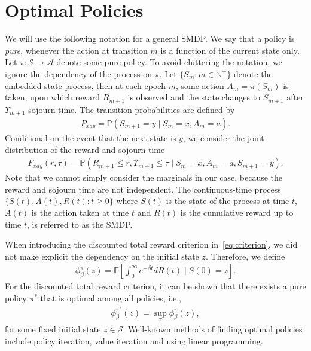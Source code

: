 \documentclass{article}
\theoremstyle{definition}
\theoremstyle{plain}
\begin{document}
\section{Optimal Policies}

We will use the following notation for a general SMDP. We say that a policy is
\textit{pure}, whenever the action at transition $m$ is a function of the
current state only. Let $\pi : \mathcal{S} \rightarrow \mathcal{A}$ denote some
pure policy. To avoid cluttering the notation, we ignore the dependency of the
process on $\pi$. Let $\{ S_{m} : m \in \mathbb{N}^{+} \}$ denote the embedded
state process, then at each epoch $m$, some action $A_{m} = \pi(S_{m})$ is
taken, upon which reward $R_{m+1}$ is observed and the state changes to
$S_{m+1}$ after $\Upsilon_{m+1}$ sojourn time. The transition probabilities are
defined by
\begin{align}
  P_{xay} = \mathbb{P}(S_{m+1} = y \; | \; S_{m} = x, A_{m} = a) .
\end{align}
Conditional on the event that the next state is $y$, we consider the joint
distribution of the reward and sojourn time
\begin{align}
  F_{xay}(r, \tau) = \mathbb{P}(R_{m+1} \leq r, \Upsilon_{m+1} \leq \tau \; | \; S_{m} = x, A_{m} = a, S_{m+1} = y ) .
\end{align}
Note that we cannot simply consider the marginals in our case, because the
reward and sojourn time are not independent. The continuous-time process
$\{ S(t), A(t), R(t) : t \geq 0 \}$ where $S(t)$ is the state of the process at
time $t$, $A(t)$ is the action taken at time $t$ and $R(t)$ is the cumulative
reward up to time $t$, is referred to as the SMDP.

When introducing the discounted total reward criterion in~\eqref{eq:criterion},
we did not make explicit the dependency on the initial state $z$. Therefore, we
define
\begin{align}
  \phi_{\beta}^{\pi}(z) = \mathbb{E} \left[ \int_{0}^{\infty} e^{- \beta t} dR(t) \; \big| \; S(0) = z \right] .
\end{align}
%
For the discounted total reward criterion,
it can be shown that there exists a pure policy $\pi^{*}$ that is optimal among
all policies, i.e.,
\begin{align}
  \phi_{\beta}^{\pi^{*}}(z) = \sup_{\pi} \phi_{\beta}^{\pi}(z) ,
\end{align}
for some fixed initial state $z \in \mathcal{S}$. Well-known methods of finding
optimal policies include policy iteration, value iteration and using linear
programming.
\end{document}

